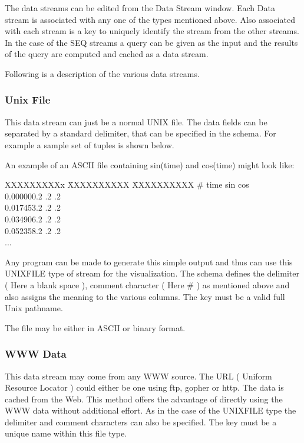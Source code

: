 	The data streams can be edited from the Data Stream window. Each Data  stream is associated with any one of the types mentioned above. Also associated with each stream is a key to uniquely identify the stream from the other streams. In the case of the SEQ streams a query can be given as the input and the results of the query are computed and cached as a data stream.

Following is a description of the various data streams.

\subsubsection{Unix File}

This  data stream can just be a normal UNIX file. The data fields can be separated by a standard delimiter, that can be specified in the schema. For example a sample set of tuples is shown below.

An example of an ASCII file containing sin(time) and cos(time) might look like:\\ 
\begin{tabbing}
XXXXXXXXXx \= XXXXXXXXXX \= XXXXXXXXXX \kill
\#  time \> sin \> cos \\
0.000000.2 .2 .2 \\
0.017453.2 .2 .2 \\
0.034906.2 .2 .2 \\
0.052358.2 .2 .2 \\
... 
\end{tabbing}

Any program can be made to generate this simple output and thus can use this UNIXFILE type of stream for the visualization. The schema defines the delimiter ( Here a blank space ), comment character ( Here \# )  as mentioned above and also assigns the meaning to the various columns. The key must be a valid full Unix pathname.

The file may be either in  ASCII or binary format. 


\subsubsection{WWW Data}

This data stream may come from any WWW source. The URL ( Uniform Resource Locator ) could either be one using ftp, gopher or http. The data is cached from the Web. This method offers the advantage of directly using the WWW data without additional effort. As in the case of the UNIXFILE type the delimiter and comment characters can also be specified.  The key must be a unique name within this file type.

